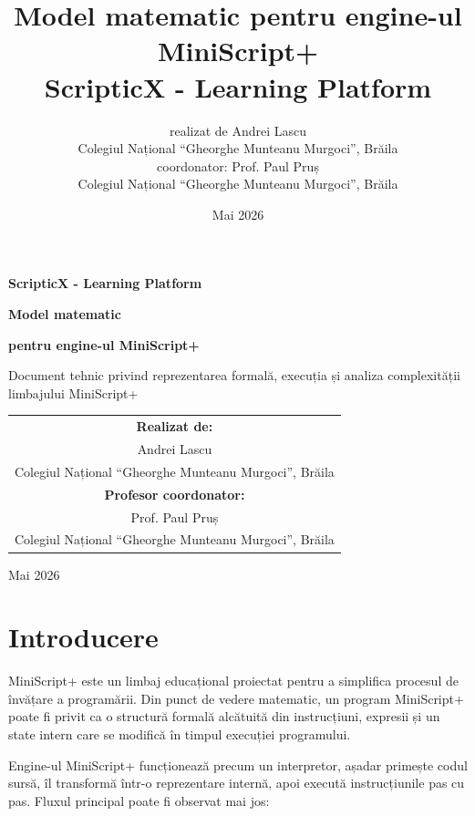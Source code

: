 \documentclass[12pt]{article}
\title{
\textbf{Model matematic pentru engine-ul MiniScript+}\\
\large ScripticX - Learning Platform
}
\author{
\begin{tabular}{c}
realizat de Andrei Lascu \\
\small Colegiul Național ``Gheorghe Munteanu Murgoci'', Brăila \\[0.5em]
\small coordonator: Prof. Paul Pruș \\
\small Colegiul Național ``Gheorghe Munteanu Murgoci'', Brăila
\end{tabular}
}
\date{\small Mai 2026}
\begin{document}
\begin{titlepage}
\centering
\vspace*{2.5cm}

{\Large \textbf{ScripticX - Learning Platform}\par}
\vspace{1.2cm}

{\Huge \textbf{Model matematic}\par}
\vspace{0.25cm}
{\Huge \textbf{pentru engine-ul MiniScript+}\par}

\vspace{1.5cm}
{\large Document tehnic privind reprezentarea formală, execuția și analiza complexității limbajului MiniScript+\par}

\vfill

\begin{tabular}{c}
\textbf{Realizat de:} \\
Andrei Lascu \\
\small Colegiul Național ``Gheorghe Munteanu Murgoci'', Brăila \\[1.2em]
\textbf{Profesor coordonator:} \\
Prof. Paul Pruș \\
\small Colegiul Național ``Gheorghe Munteanu Murgoci'', Brăila
\end{tabular}

\vfill

{\large Mai 2026\par}

\end{titlepage}

\tableofcontents
\newpage
{}

\section{Introducere}

MiniScript+ este un limbaj educațional proiectat pentru a simplifica procesul de învățare a programării. Din punct de vedere matematic, un program MiniScript+ poate fi privit ca o structură formală alcătuită din instrucțiuni, expresii și un state intern care se modifică în timpul execuției programului.

Engine-ul MiniScript+ funcționează precum un interpretor, așadar primește codul sursă, îl transformă într-o reprezentare internă, apoi execută instrucțiunile pas cu pas. Fluxul principal poate fi observat mai jos:
\end{document}
